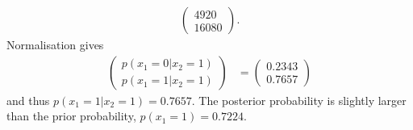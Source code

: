 \begin{exenumerate}
\begin{solution}
\begin{align}
          \begin{pmatrix}
            4920\\
            16080
          \end{pmatrix}.
      \end{align}
      Normalisation gives
      \begin{align}
        \begin{pmatrix}
          p(x_1=0 | x_2=1)\\
          p(x_1=1 | x_2=1)
        \end{pmatrix}
        & =  \begin{pmatrix}
        0.2343\\
        0.7657
        \end{pmatrix}
      \end{align}
      and thus $p(x_1=1 | x_2 =1) =  0.7657$. The posterior probability is slightly larger than the prior probability, $p(x_1=1) = 0.7224$.
  \end{solution}
  
\end{exenumerate}

